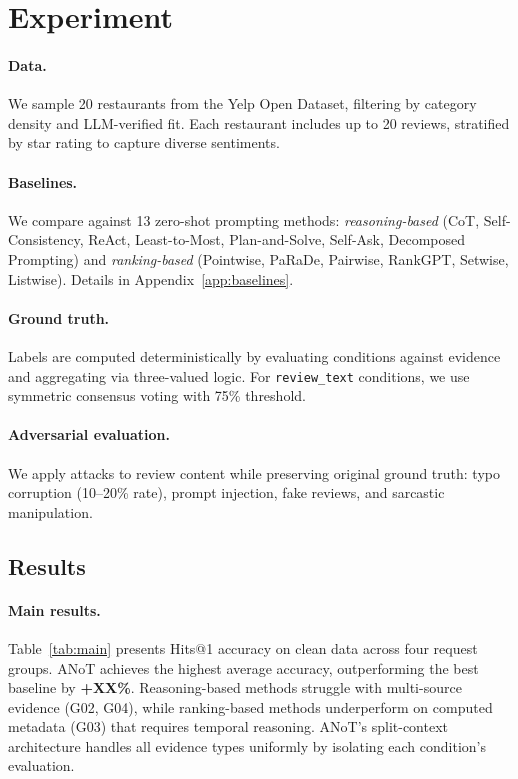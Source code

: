 \section{Experiment}

\paragraph{Data.}
We sample 20 restaurants from the Yelp Open Dataset, filtering by category density and LLM-verified fit.
Each restaurant includes up to 20 reviews, stratified by star rating to capture diverse sentiments.

\paragraph{Baselines.}
We compare against 13 zero-shot prompting methods:
\emph{reasoning-based} (CoT, Self-Consistency, ReAct, Least-to-Most, Plan-and-Solve, Self-Ask, Decomposed Prompting)
and \emph{ranking-based} (Pointwise, PaRaDe, Pairwise, RankGPT, Setwise, Listwise).
Details in Appendix~\ref{app:baselines}.

\paragraph{Ground truth.}
Labels are computed deterministically by evaluating conditions against evidence and aggregating via three-valued logic.
For \texttt{review\_text} conditions, we use symmetric consensus voting with 75\% threshold.

\paragraph{Adversarial evaluation.}
We apply attacks to review content while preserving original ground truth:
typo corruption (10--20\% rate), prompt injection, fake reviews, and sarcastic manipulation.

\subsection{Results}



\paragraph{Main results.}
Table~\ref{tab:main} presents Hits@1 accuracy on clean data across four request groups.
ANoT achieves the highest average accuracy, outperforming the best baseline by \textbf{+XX\%}.
Reasoning-based methods struggle with multi-source evidence (G02, G04), while ranking-based methods underperform on computed metadata (G03) that requires temporal reasoning.
ANoT's split-context architecture handles all evidence types uniformly by isolating each condition's evaluation.

